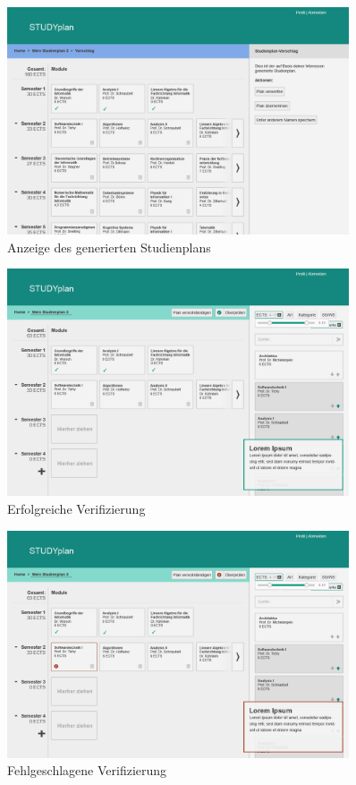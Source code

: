 \begin{figure}
	\caption{Anzeige des generierten Studienplans}
	\label{fig:gui-generierung-4}
	\centering
	\includegraphics[width=0.9\textwidth]{../GUI/ergebnisse/generierung-4.png}
\end{figure}
\begin{figure}
	\caption{Erfolgreiche Verifizierung}
	\label{fig:gui-verifizierung-1}
	\centering
	\includegraphics[width=0.9\textwidth]{../GUI/ergebnisse/verifizierung-1.png}
\end{figure}
\begin{figure}
	\caption{Fehlgeschlagene Verifizierung}
	\label{fig:gui-verifizierung-2}
	\centering
	\includegraphics[width=0.9\textwidth]{../GUI/ergebnisse/verifizierung-2.png}
\end{figure}
